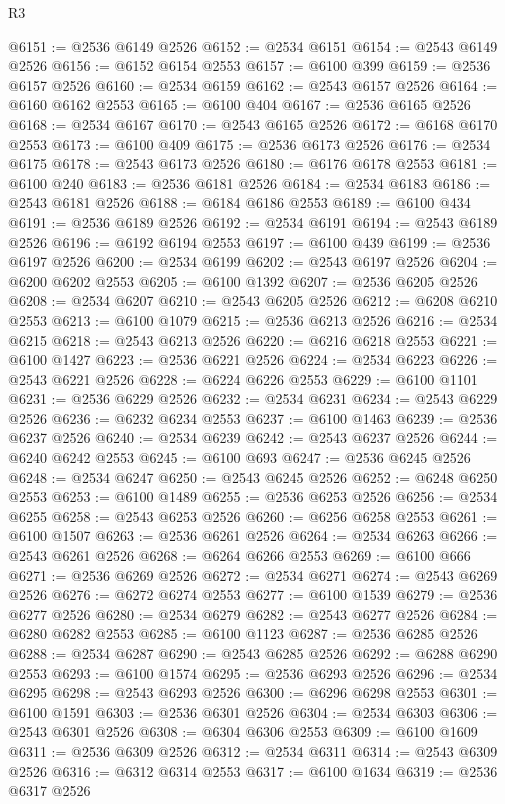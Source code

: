 \begin{lexlean}{R3}
\begin{coremodule}
@6151 := @2536 @6149 @2526
@6152 := @2534 @6151
@6154 := @2543 @6149 @2526
@6156 := @6152 @6154 @2553
@6157 := @6100 @399
@6159 := @2536 @6157 @2526
@6160 := @2534 @6159
@6162 := @2543 @6157 @2526
@6164 := @6160 @6162 @2553
@6165 := @6100 @404
@6167 := @2536 @6165 @2526
@6168 := @2534 @6167
@6170 := @2543 @6165 @2526
@6172 := @6168 @6170 @2553
@6173 := @6100 @409
@6175 := @2536 @6173 @2526
@6176 := @2534 @6175
@6178 := @2543 @6173 @2526
@6180 := @6176 @6178 @2553
@6181 := @6100 @240
@6183 := @2536 @6181 @2526
@6184 := @2534 @6183
@6186 := @2543 @6181 @2526
@6188 := @6184 @6186 @2553
@6189 := @6100 @434
@6191 := @2536 @6189 @2526
@6192 := @2534 @6191
@6194 := @2543 @6189 @2526
@6196 := @6192 @6194 @2553
@6197 := @6100 @439
@6199 := @2536 @6197 @2526
@6200 := @2534 @6199
@6202 := @2543 @6197 @2526
@6204 := @6200 @6202 @2553
@6205 := @6100 @1392
@6207 := @2536 @6205 @2526
@6208 := @2534 @6207
@6210 := @2543 @6205 @2526
@6212 := @6208 @6210 @2553
@6213 := @6100 @1079
@6215 := @2536 @6213 @2526
@6216 := @2534 @6215
@6218 := @2543 @6213 @2526
@6220 := @6216 @6218 @2553
@6221 := @6100 @1427
@6223 := @2536 @6221 @2526
@6224 := @2534 @6223
@6226 := @2543 @6221 @2526
@6228 := @6224 @6226 @2553
@6229 := @6100 @1101
@6231 := @2536 @6229 @2526
@6232 := @2534 @6231
@6234 := @2543 @6229 @2526
@6236 := @6232 @6234 @2553
@6237 := @6100 @1463
@6239 := @2536 @6237 @2526
@6240 := @2534 @6239
@6242 := @2543 @6237 @2526
@6244 := @6240 @6242 @2553
@6245 := @6100 @693
@6247 := @2536 @6245 @2526
@6248 := @2534 @6247
@6250 := @2543 @6245 @2526
@6252 := @6248 @6250 @2553
@6253 := @6100 @1489
@6255 := @2536 @6253 @2526
@6256 := @2534 @6255
@6258 := @2543 @6253 @2526
@6260 := @6256 @6258 @2553
@6261 := @6100 @1507
@6263 := @2536 @6261 @2526
@6264 := @2534 @6263
@6266 := @2543 @6261 @2526
@6268 := @6264 @6266 @2553
@6269 := @6100 @666
@6271 := @2536 @6269 @2526
@6272 := @2534 @6271
@6274 := @2543 @6269 @2526
@6276 := @6272 @6274 @2553
@6277 := @6100 @1539
@6279 := @2536 @6277 @2526
@6280 := @2534 @6279
@6282 := @2543 @6277 @2526
@6284 := @6280 @6282 @2553
@6285 := @6100 @1123
@6287 := @2536 @6285 @2526
@6288 := @2534 @6287
@6290 := @2543 @6285 @2526
@6292 := @6288 @6290 @2553
@6293 := @6100 @1574
@6295 := @2536 @6293 @2526
@6296 := @2534 @6295
@6298 := @2543 @6293 @2526
@6300 := @6296 @6298 @2553
@6301 := @6100 @1591
@6303 := @2536 @6301 @2526
@6304 := @2534 @6303
@6306 := @2543 @6301 @2526
@6308 := @6304 @6306 @2553
@6309 := @6100 @1609
@6311 := @2536 @6309 @2526
@6312 := @2534 @6311
@6314 := @2543 @6309 @2526
@6316 := @6312 @6314 @2553
@6317 := @6100 @1634
@6319 := @2536 @6317 @2526

\end{coremodule}
\end{lexlean}
